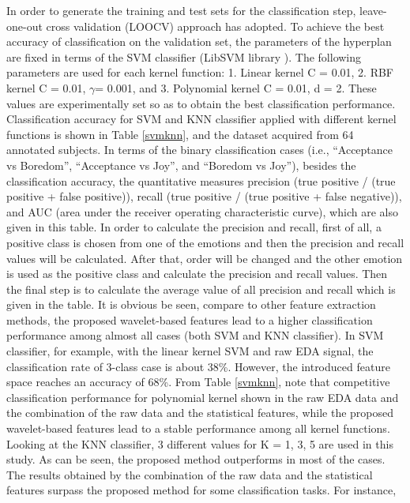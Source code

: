 In order to generate the training and test sets for the classification step, leave-one-out cross validation (LOOCV)
approach has adopted. To achieve the best accuracy of classification on the validation set, the parameters of the 
hyperplan are fixed in terms of the SVM classifier (LibSVM library \cite{chang2011libsvm}). 
The following parameters are used for each kernel function: 1. Linear kernel C = 0.01, 2. RBF kernel C = 0.01, $\gamma$= 0.001, 
and 3. Polynomial kernel C = 0.01, d = 2. These values are experimentally set so as to obtain the best classification performance.\\

Classification accuracy for SVM and KNN classifier applied with different kernel functions is shown in Table \ref{svmknn},
and the dataset acquired from 64 annotated subjects. In terms of the binary classification cases (i.e., “Acceptance vs 
Boredom”, “Acceptance vs Joy”, and “Boredom vs Joy”), besides the classification accuracy, the quantitative measures 
precision (true positive / (true positive + false positive)), recall (true positive / (true positive + false negative)), 
and AUC (area under the receiver operating characteristic curve), which are also given in this table. In order to 
calculate the precision and recall, first of all, a positive class is chosen from one of the emotions and then the 
precision and recall values will be calculated. After that, order will be changed and the other emotion is used as
the positive class and calculate the precision and recall values. Then the final step is to calculate the average value
of all precision and recall which is given in the table. It is obvious be seen, compare to other feature extraction
methods, the proposed wavelet-based features lead to a higher classification performance among almost all cases (both
SVM and KNN classifier). In SVM classifier, for example, with the linear kernel SVM and raw EDA signal, the classification
rate of 3-class case is about 38\%. However, the introduced feature space reaches an accuracy of 68\%. From Table \ref{svmknn}, 
note that competitive classification performance for polynomial kernel shown in the raw EDA data and the combination of 
the raw data and the statistical features, while the proposed wavelet-based features lead to a stable performance among
all kernel functions. Looking at the KNN classifier, 3 different values for K = 1, 3, 5 are used in this study.
As can be seen, the proposed method outperforms in most of the cases. The results obtained by the combination of the 
raw data and the statistical features surpass the proposed method for some classification tasks. For instance,
